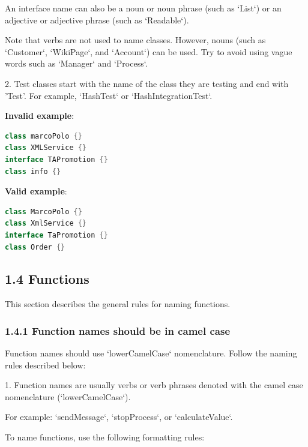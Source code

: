 An interface name can also be a noun or noun phrase (such as `List`) or an adjective or adjective phrase (such as `Readable`).


Note that verbs are not used to name classes. However, nouns (such as `Customer`, `WikiPage`, and `Account`) can be used. Try to avoid using vague words such as `Manager` and `Process`.



2.	Test classes start with the name of the class they are testing and end with 'Test'. For example, `HashTest` or `HashIntegrationTest`.



\textbf{Invalid example}: 

\begin{lstlisting}[language=Kotlin]
class marcoPolo {} 
class XMLService {} 
interface TAPromotion {}
class info {}
\end{lstlisting}


\textbf{Valid example}: 

\begin{lstlisting}[language=Kotlin]
class MarcoPolo {}
class XmlService {}
interface TaPromotion {}
class Order {}
\end{lstlisting}


\subsection*{\textbf{1.4 Functions}}

\label{sec:1.4}

This section describes the general rules for naming functions.

\subsubsection*{\textbf{1.4.1 Function names should be in camel case}}
\leavevmode\newline

\label{sec:1.4.1}

Function names should use `lowerCamelCase` nomenclature. Follow the naming rules described below:

1.	Function names are usually verbs or verb phrases denoted with the camel case nomenclature (`lowerCamelCase`).

For example: `sendMessage`, `stopProcess`, or `calculateValue`.

To name functions, use the following formatting rules:



